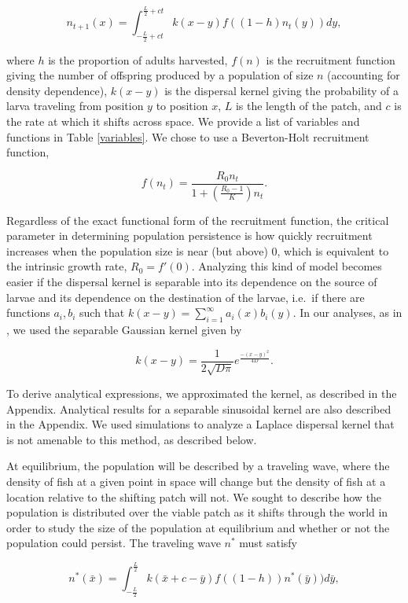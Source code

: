 \documentclass[12pt,english]{article}
\begin{document}
\begin{spacing}{1.9}
\begin{flushleft}
\begin{equation*}
n_{t+1}(x)=\int^{\frac{L}{2}+ct}_{-\frac{L}{2}+ct}k(x-y)f((1-h)n_t(y))dy \label{integrodifference},
\end{equation*}

\noindent where $h$ is the proportion of adults harvested, $f(n)$ is the recruitment function giving the number of 
offspring produced by a population of size $n$ (accounting for density dependence), $k(x-y)$ is the dispersal kernel giving the probability of a  larva traveling from position $y$ to position $x$, $L$ is the length of the patch, and $c$ is the rate at which it  shifts across space.  We provide a list of variables and functions in Table \ref{variables}.  We chose to use a Beverton-Holt recruitment function,

\[f(n_t)=\frac{R_0n_t}{1+\left(\frac{R_0-1}{K}\right)n_t}.\]  

\noindent Regardless of the exact functional form of the recruitment function, the critical parameter in determining population persistence is how quickly recruitment increases when the population 
size is near (but above) $0$, which is equivalent to the intrinsic growth rate, $R_0=f'(0)$.  Analyzing this kind of model becomes easier if the dispersal kernel is separable into its dependence on the source of larvae and its dependence on the destination of the larvae, i.e.~if there are functions $a_i, b_i$ such that $k(x- y) = \sum^\infty_{i=1} a_i(x)b_i(y)$.  In our analyses, as in \citep{Latore:1998fk}, we used the separable Gaussian kernel given by

\[k(x-y)=\frac{1}{2\sqrt{D\pi}}e^{\frac{-(x-y)^2}{4D}}.\]

\noindent To derive analytical expressions, we approximated the kernel, as described in the Appendix.  Analytical results for a separable sinusoidal kernel are also described in the Appendix.  We used 
simulations to analyze a Laplace dispersal kernel that is not amenable to this method, as described below.  

At equilibrium, the population will be described by a traveling wave, 
where the density of fish at a given point in space will change but the density of fish at a location relative to the 
shifting  patch will not. We sought to describe how the population is distributed over the viable 
patch as it shifts through the world in order to study the size of the population at equilibrium and whether or not the population could persist.  The traveling wave $n^*$ must 
satisfy

\begin{equation}
n^*(\bar{x})=\int^{\frac{L}{2}}_{-\frac{L}{2}}k(\bar{x}+c-\bar{y})f((1-h))n^*(\bar{y}))d
\bar{y}, \label{traveling_pulse}
\end{equation}


\end{flushleft}
\end{spacing}
\end{document}

